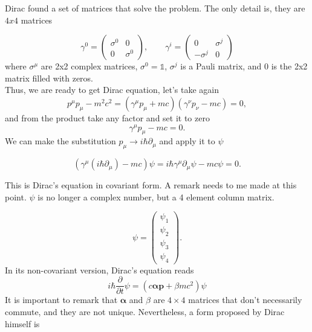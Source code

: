 Dirac found a set of matrices that solve the problem. The only detail is, they are $4x4$ matrices

\begin{equation}
  \gamma^0 = \begin{pmatrix}
    \sigma^0 & 0\\
    0 & \sigma^0
  \end{pmatrix} , \qquad
  \gamma^i = \begin{pmatrix}
    0 & \sigma^j\\
    -\sigma^j & 0
  \end{pmatrix}
\end{equation}
where $\sigma^\mu$ are 2x2 complex matrices, $\sigma^0 = \mathbb{1}$, $\sigma^j$ is a Pauli matrix, and $0$ is the 2x2 matrix filled with zeros.\\

Thus, we are ready to get Dirac equation, let's take again
\begin{equation*}
  p^\mu p_\mu - m^2c^2 = (\gamma^\mu p_\mu + mc)(\gamma^\nu p_\nu -mc) = 0,
\end{equation*}
and from the product take any factor and set it to zero
\begin{equation}
  \gamma^\mu p_\mu - mc = 0.
\end{equation}
We can make the substitution $p_\mu \rightarrow i\hbar \partial_\mu$ and apply it to $\psi$

\begin{equation}
  (\gamma^\mu (i\hbar \partial_\mu) - mc)\psi = i\hbar \gamma^\mu \partial_\mu \psi - mc\psi = 0.
\end{equation}

This is Dirac's equation in covariant form. A remark needs to me made at this point. $\psi$ is no longer a complex number, but a 4 element column matrix.

\begin{equation}
  \psi = \begin{pmatrix}
    \psi_1\\
    \psi_2\\
    \psi_3\\
    \psi_4
  \end{pmatrix}.
\end{equation}
In its non-covariant version, Dirac's equation reads
\begin{equation}
    i\hbar \frac{\partial}{\partial t} \psi = (c \bm{\alpha} \bm{p} + \beta mc^2)\psi
\end{equation}
It is important to remark that $\bm{\alpha}$ and $\beta$ are $4\times4$ matrices that don't necessarily commute, and they are not unique. Nevertheless, a form proposed by Dirac himself is 

